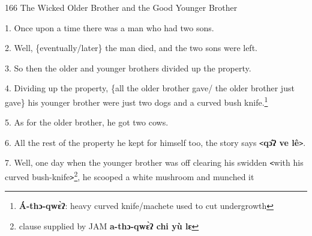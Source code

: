 
166 The Wicked Older Brother and the Good Younger Brother

1. Once upon a time there was a man who had two sons.

2. Well, \{eventually/later\} the man died, and the two sons were left.

3. So then the older and younger brothers divided up the property.

4. Dividing up the property, \{all the older brother gave/ the older brother just
gave\} his younger brother were just two dogs and a curved bush knife.\footnote{\textbf{Á-thɔ-qwɛ̀ʔ}: heavy curved knife/machete used to cut undergrowth}

5. As for the older brother, he got two cows.

6. All the rest of the property he kept for himself too, the story says \texttt{<}\textbf{qɔ̂ʔ
ve lê}\texttt{>}.

7. Well, one day when the younger brother was off clearing his swidden \texttt{<}with
his curved bush-knife\texttt{>}\footnote{clause supplied by JAM \textbf{a-thɔ-qwɛ̀ʔ chi yù lɛ }}, he scooped a white mushroom and munched it
